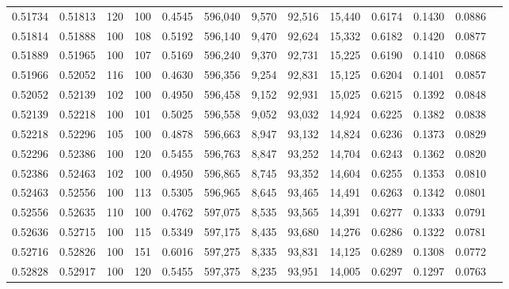 \begin{tabular}{rrrrrrrrrrrrr}
0.51734 & 0.51813 &   120 & 100 &                                     0.4545 & 596,040 &   9,570 &  92,516 &  15,440 & 0.6174 & 0.1430 & 0.0886 \\
0.51814 & 0.51888 &   100 & 108 &                                     0.5192 & 596,140 &   9,470 &  92,624 &  15,332 & 0.6182 & 0.1420 & 0.0877 \\
0.51889 & 0.51965 &   100 & 107 &                                     0.5169 & 596,240 &   9,370 &  92,731 &  15,225 & 0.6190 & 0.1410 & 0.0868 \\
0.51966 & 0.52052 &   116 & 100 &                                     0.4630 & 596,356 &   9,254 &  92,831 &  15,125 & 0.6204 & 0.1401 & 0.0857 \\
0.52052 & 0.52139 &   102 & 100 &                                     0.4950 & 596,458 &   9,152 &  92,931 &  15,025 & 0.6215 & 0.1392 & 0.0848 \\
0.52139 & 0.52218 &   100 & 101 &                                     0.5025 & 596,558 &   9,052 &  93,032 &  14,924 & 0.6225 & 0.1382 & 0.0838 \\
0.52218 & 0.52296 &   105 & 100 &                                     0.4878 & 596,663 &   8,947 &  93,132 &  14,824 & 0.6236 & 0.1373 & 0.0829 \\
0.52296 & 0.52386 &   100 & 120 &                                     0.5455 & 596,763 &   8,847 &  93,252 &  14,704 & 0.6243 & 0.1362 & 0.0820 \\
0.52386 & 0.52463 &   102 & 100 &                                     0.4950 & 596,865 &   8,745 &  93,352 &  14,604 & 0.6255 & 0.1353 & 0.0810 \\
0.52463 & 0.52556 &   100 & 113 &                                     0.5305 & 596,965 &   8,645 &  93,465 &  14,491 & 0.6263 & 0.1342 & 0.0801 \\
0.52556 & 0.52635 &   110 & 100 &                                     0.4762 & 597,075 &   8,535 &  93,565 &  14,391 & 0.6277 & 0.1333 & 0.0791 \\
0.52636 & 0.52715 &   100 & 115 &                                     0.5349 & 597,175 &   8,435 &  93,680 &  14,276 & 0.6286 & 0.1322 & 0.0781 \\
0.52716 & 0.52826 &   100 & 151 &                                     0.6016 & 597,275 &   8,335 &  93,831 &  14,125 & 0.6289 & 0.1308 & 0.0772 \\
0.52828 & 0.52917 &   100 & 120 &                                     0.5455 & 597,375 &   8,235 &  93,951 &  14,005 & 0.6297 & 0.1297 & 0.0763 \\

\end{tabular}
